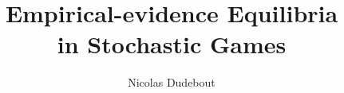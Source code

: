 \documentclass[aspectratio=43]{beamer}
\title{Empirical-evidence Equilibria\\ in Stochastic Games}
\author{Nicolas Dudebout}
\date{}
\begin{document}
\makeatletter
\gdef\beamer@descriptionwidth{80pt}
\makeatother

\begin{frame}[plain]
\maketitle
\end{frame}

\setcounter{framenumber}{0}


\end{document}

